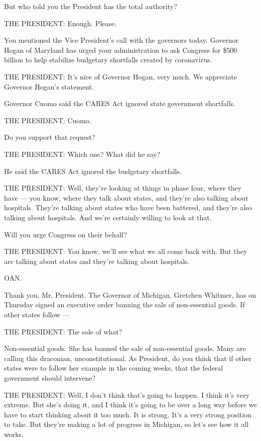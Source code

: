 But who told you the President has the total authority?

THE PRESIDENT: Enough. Please.

You mentioned the Vice President's call with the governors today.
Governor Hogan of Maryland has urged your administration to ask Congress
for \$500 billion to help stabilize budgetary shortfalls created by
coronavirus.

THE PRESIDENT: It's nice of Governor Hogan, very much. We appreciate
Governor Hogan's statement.

Governor Cuomo said the CARES Act ignored state government shortfalls.

THE PRESIDENT: Cuomo.

Do you support that request?

THE PRESIDENT: Which one? What did he say?

He said the CARES Act ignored the budgetary shortfalls.

THE PRESIDENT: Well, they're looking at things in phase four, where they
have --- you know, where they talk about states, and they're also
talking about hospitals. They're talking about states who have been
battered, and they're also talking about hospitals. And we're certainly
willing to look at that.

Will you urge Congress on their behalf?

THE PRESIDENT: You know, we'll see what we all come back with. But they
are talking about states and they're talking about hospitals.

OAN.

Thank you, Mr. President. The Governor of Michigan, Gretchen Whitmer,
has on Thursday signed an executive order banning the sale of
non-essential goods. If other states follow ---

THE PRESIDENT: The sale of what?

Non-essential goods. She has banned the sale of non-essential goods.
Many are calling this draconian, unconstitutional. As President, do you
think that if other states were to follow her example in the coming
weeks, that the federal government should intervene?

THE PRESIDENT: Well, I don't think that's going to happen. I think it's
very extreme. But she's doing it, and I think it's going to be over a
long way before we have to start thinking about it too much. It is
strong. It's a very strong position to take. But they're making a lot of
progress in Michigan, so let's see how it all works.

